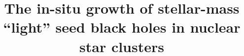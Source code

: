 \documentclass[twocolumn]{aastex631}
\begin{document}
\title{The in-situ growth of stellar-mass ``light'' seed black holes in nuclear star clusters}


\end{document}
